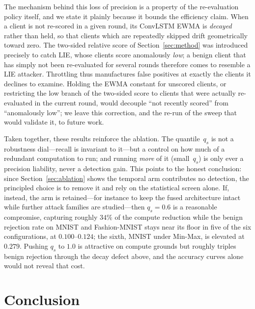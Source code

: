 \documentclass[journal]{IEEEtran}
\begin{document}
The mechanism behind this loss of precision is a property of the re-evaluation policy itself, and we state it plainly because it bounds the efficiency claim. When a client is not re-scored in a given round, its ConvLSTM EWMA is \emph{decayed} rather than held, so that clients which are repeatedly skipped drift geometrically toward zero. The two-sided relative score of Section~\ref{sec:method} was introduced precisely to catch LIE, whose clients score anomalously \emph{low}; a benign client that has simply not been re-evaluated for several rounds therefore comes to resemble a LIE attacker. Throttling thus manufactures false positives at exactly the clients it declines to examine. Holding the EWMA constant for unscored clients, or restricting the low branch of the two-sided score to clients that were actually re-evaluated in the current round, would decouple ``not recently scored'' from ``anomalously low''; we leave this correction, and the re-run of the sweep that would validate it, to future work.

Taken together, these results reinforce the ablation. The quantile~$q_s$ is not a robustness dial---recall is invariant to it---but a control on how much of a redundant computation to run; and running \emph{more} of it (small~$q_s$) is only ever a precision liability, never a detection gain. This points to the honest conclusion: since Section~\ref{sec:ablation} shows the temporal arm contributes no detection, the principled choice is to remove it and rely on the statistical screen alone. If, instead, the arm is retained---for instance to keep the fused architecture intact while further attack families are studied---then $q_s = 0.6$ is a reasonable compromise, capturing roughly $34\%$ of the compute reduction while the benign rejection rate on MNIST and Fashion-MNIST stays near its floor in five of the six configurations, at $0.100$--$0.124$; the sixth, MNIST under Min-Max, is elevated at $0.279$. Pushing $q_s$ to $1.0$ is attractive on compute grounds but roughly triples benign rejection through the decay defect above, and the accuracy curves alone would not reveal that cost.



\section{Conclusion}
\label{sec:conclusion}
\end{document}
